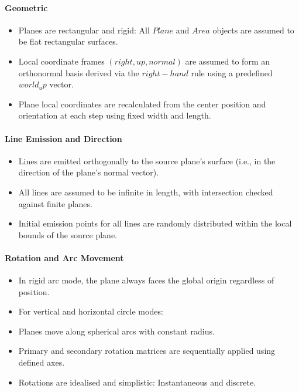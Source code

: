 \paragraph{Geometric}
\begin{itemize}
    \item Planes are rectangular and rigid: All $Plane$ and $Area$ objects are assumed to be flat rectangular surfaces.
    \item Local coordinate frames $(right, up, normal)$ are assumed to form an orthonormal basis derived via the $right-hand$ rule using a predefined $world_up$ vector.
    \item Plane local coordinates are recalculated from the center position and orientation at each step using fixed width and length.
\end{itemize}

\paragraph{Line Emission and Direction}
\begin{itemize}
    \item Lines are emitted orthogonally to the source plane’s surface (i.e., in the direction of the plane’s normal vector).

    \item All lines are assumed to be infinite in length, with intersection checked against finite planes.
    
    \item Initial emission points for all lines are randomly distributed within the local bounds of the source plane.
\end{itemize}

\paragraph{Rotation and Arc Movement}
\begin{itemize}
    \item In rigid arc mode, the plane always faces the global origin regardless of position.

    \item For vertical and horizontal circle modes:
    \item Planes move along spherical arcs with constant radius.
    \item Primary and secondary rotation matrices are sequentially applied using defined axes.
    \item Rotations are idealised and simplistic: Instantaneous and discrete.
\end{itemize}

